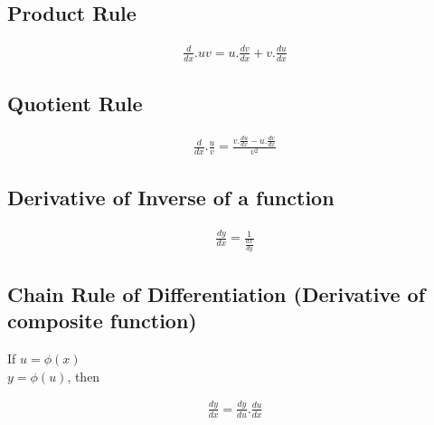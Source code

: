 \subsection{Product Rule}
\begin{tcolorbox}
\begin{center}
\begin{align*}
\frac{d}{dx}.uv= u.\frac{dv}{dx} + v.\frac{du}{dx}
\end{align*}
\end{center}
\end{tcolorbox}

\subsection{Quotient Rule}
\begin{tcolorbox}
\begin{center}
\begin{align*}
\frac{d}{dx}.\frac{u}{v} = \frac{v.\frac{du}{dx} - u.\frac{dv}{dx}}{v^2}
\end{align*}
\end{center}
\end{tcolorbox}

\subsection{Derivative of Inverse of a function}
\begin{tcolorbox}
\begin{center}
\begin{align*}
\frac{dy}{dx} = \frac{1}{\frac{dx}{dy}}
\end{align*}
\end{center}
\end{tcolorbox}

\subsection{Chain Rule of Differentiation (Derivative of composite function)}
If $u = \phi(x)$ \\
$y = \phi(u)$, then \\
\begin{tcolorbox}
\begin{center}
\begin{align*}
\frac{dy}{dx} = \frac{dy}{du}.\frac{du}{dx} 
\end{align*}
\end{center}
\end{tcolorbox}